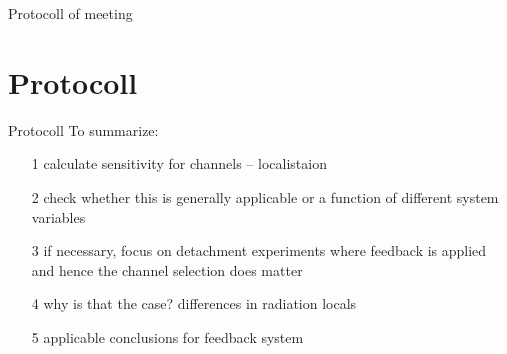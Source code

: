\documentclass{beamer}
\begin{document}
    \begin{frame}{Protocoll of meeting}
        \section{Protocoll}
        \begin{block}{Protocoll}
            To summarize:
            \begin{itemize}
                \item[1]{%
                    calculate sensitivity for channels -- localistaion%
                }
                \item[2]{%
                    check whether this is generally applicable or a %
                    function of different system variables%
                }
                \item[3]{%
                    if necessary, focus on detachment experiments where %
                    feedback is applied and hence the channel selection %
                    does matter%
                }
                \item[4]{%
                    why is that the case? differences in radiation locals%
                }
                \item[5]{%
                    applicable conclusions for feedback system}
            \end{itemize}
        \end{block}
    \end{frame}
\end{document}
